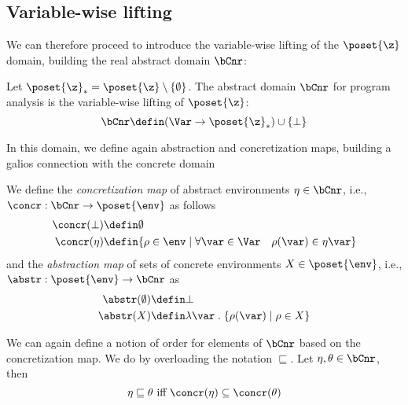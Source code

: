 \subsection{Variable-wise lifting}
\label{sub:vwintervals}

We can therefore proceed to introduce the variable-wise lifting of the
\(\poset{\z}\) domain, building the real abstract domain \(\bCnr\):

\begin{definition}
  Let \(\poset{\z}_* = \poset{\z} \setminus \{\emptyset\}\). The
  abstract domain \(\bCnr\) for program analysis is the variable-wise
  lifting of \(\poset{\z}\):
  \[ \bCnr \defin (\Var \to \poset{\z}_*) \cup \{ \bot \} \]
\end{definition}

In this domain, we define again abstraction and concretization maps,
building a galios connection with the concrete domain

\begin{definition}
  \label{def:vwgalios}
  We define the \emph{concretization map} of abstract environments
  \(\eta \in \bCnr\), i.e., \({\concr : \bCnr \to \poset{\env}}\) as
  follows
  \begin{align*}
    \concr(\bot) & \defin \emptyset \\
    \concr(\eta) & \defin \{\rho \in \env \mid \forall \var \in \Var \quad \rho(\var) \in \eta\var\}
  \end{align*}
  and the \emph{abstraction map} of sets of concrete environments
  \(X \in \poset{\env}\), i.e., \(\abstr : \poset{\env} \to \bCnr\) as
  \begin{align*}
    \abstr(\emptyset) & \defin \bot \\
    \abstr(X) & \defin \lambda \var \; . \; \{\rho(\var) \mid \rho \in X\} \\
  \end{align*}
\end{definition}

We can again define a notion of order for elements of \(\bCnr\) based
on the concretization map. We do by overloading the notation
\(\sqsubseteq\). Let \(\eta, \theta \in \bCnr\), then
\begin{equation*}
  \eta \sqsubseteq \theta \text{ iff } \concr(\eta) \subseteq \concr(\theta)
\end{equation*}

